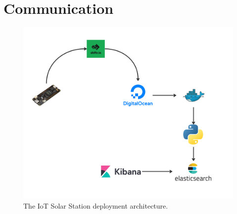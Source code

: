 \section{Communication}

\begin{figure}[H]
    \centering
    \includegraphics[width=\linewidth]{../assets/png/solar-station-arch.jpg}
    \caption{The IoT Solar Station deployment architecture.}
    \label{fig:kib}
\end{figure}\

